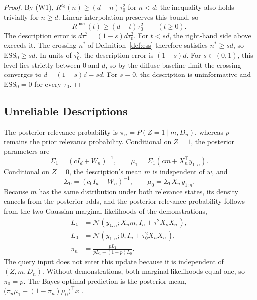 \documentclass{article}
\theoremstyle{definition}
\newcommand{\ess}{\mathrm{ESS}}
\begin{document}
\begin{proof}
By (W1), $R^{c_0}(n)\ge(d-n)\tau_0^2$ for $n<d$; the inequality also holds trivially for $n\ge d$. Linear interpolation preserves this bound, so
\[
R^{\mathrm{base}}(t)\ge(d-t)\tau_0^2\qquad(t\ge0).
\]
The description error is $d\tau^2=(1-s)d\tau_0^2$. For $t<sd$, the right-hand side above exceeds it. The crossing $n^*$ of Definition~\ref{def:ess} therefore satisfies $n^*\ge sd$, so $\ess_0\ge sd$. In units of $\tau_0^2$, the description error is $(1-s)d$. For $s\in(0,1)$, this level lies strictly between $0$ and $d$, so by the diffuse-baseline limit the crossing converges to $d-(1-s)d=sd$. For $s=0$, the description is uninformative and $\ess_0=0$ for every $\tau_0$.
\end{proof}

\subsection{Unreliable Descriptions}\label{app:reliability}

The posterior relevance probability is $\pi_n=P(Z=1\mid m,D_n)$, whereas $p$ remains the prior relevance probability. Conditional on $Z=1$, the posterior parameters are
\[
\Sigma_1=(cI_d+W_n)^{-1},
\qquad
\mu_1=\Sigma_1(c m+X_n^\top y_{1:n}).
\]
Conditional on $Z=0$, the description's mean $m$ is independent of $w$, and
\[
\Sigma_0=(c_0I_d+W_n)^{-1},
\qquad
\mu_0=\Sigma_0X_n^\top y_{1:n}.
\]
Because $m$ has the same distribution under both relevance states, its density cancels from the posterior odds, and the posterior relevance probability follows from the two Gaussian marginal likelihoods of the demonstrations,
\begin{align*}
L_1&=\mathcal N\!\left(y_{1:n};X_nm,I_n+\tau^2X_nX_n^\top\right),\\
L_0&=\mathcal N\!\left(y_{1:n};0,I_n+\tau_0^2X_nX_n^\top\right),\\
\pi_n&=\frac{pL_1}{pL_1+(1-p)L_0}.
\end{align*}
The query input does not enter this update because it is independent of $(Z,m,D_n)$. Without demonstrations, both marginal likelihoods equal one, so $\pi_0=p$. The Bayes-optimal prediction is the posterior mean, $\big(\pi_n\mu_1+(1-\pi_n)\mu_0\big)^\top x$ \citep{hoeting1999}.
\end{document}
